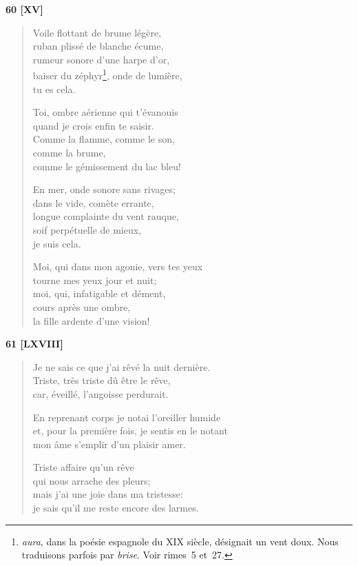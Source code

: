 
\begin{center}
  \textbf{60 [XV]}
\end{center}

\vspace*{-14pt}

\begin{verse}
  Voile flottant de brume légère, \\
  ruban plissé de blanche écume, \\
  rumeur sonore
  d'une harpe d'or, \\
  baiser du zéphyr\footnote{\emph{aura}, dans la poésie espagnole du XIX\ieme{}
  siècle, désignait un vent doux. Nous traduisons parfois par
  \emph{brise}. Voir rimes~5 et~27.}, onde de lumière, \\
  tu es cela.

  Toi, ombre aérienne qui t'évanouis \\
  quand je crois enfin te saisir. \\
  Comme la flamme, comme le son, \\
  comme la brume, \\
  comme le gémissement du lac bleu!

  En mer, onde sonore sans rivages; \\
  dans le vide, comète errante, \\
  longue complainte
  du vent rauque, \\
  soif perpétuelle de mieux, \\
  je suis cela.

  Moi, qui dans mon agonie, vers tes yeux \\
  tourne mes yeux jour et nuit; \\
  moi, qui, infatigable et dément, \\
  cours après une ombre, \\
  la fille ardente d'une vision!
\end{verse}

\pagebreak

\begin{center}
  \textbf{61 [LXVIII]}
\end{center}

\begin{verse}
  Je ne sais ce que j'ai rêvé
  la nuit dernière. \\
  Triste, très triste dû être le rêve, \\
  car, éveillé, l'angoisse perdurait.

  En reprenant corps je notai
  l'oreiller humide \\
  et, pour la première fois, je sentis en le notant \\
  mon âme s'emplir d'un plaisir amer.

  Triste affaire qu'un rêve \\
  qui nous arrache des pleurs; \\
  mais j'ai une joie dans ma tristesse: \\
  je sais qu'il me reste encore des larmes.
\end{verse}

